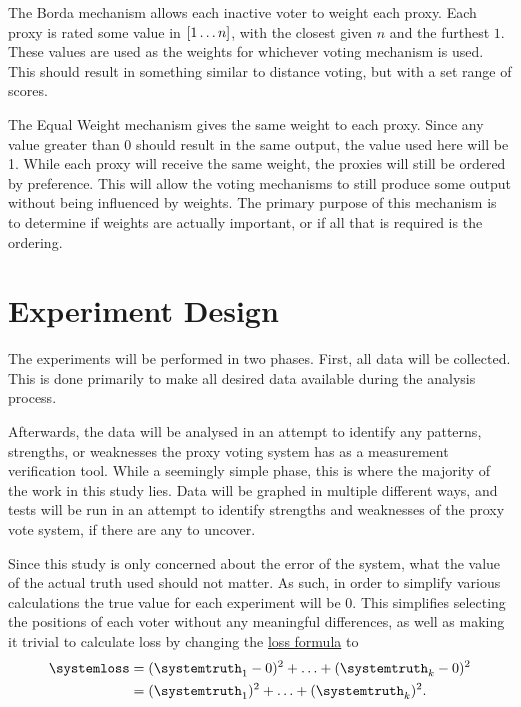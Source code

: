 \label{para:borda}
The Borda mechanism allows each inactive voter to weight each proxy.
Each proxy is rated some value in $[1 \mathellipsis n]$, with the closest
given $n$ and the furthest $1$.
These values are used as the weights for whichever voting mechanism is used.
This should result in something similar to distance voting, but with a set
range of scores.

\label{para:equal-weight}
The Equal Weight mechanism gives the same weight to each proxy.
Since any value greater than 0 should result in the same output, the value used here
will be 1.
While each proxy will receive the same weight, the proxies will still be ordered by
preference.
This will allow the voting mechanisms to still produce some output without being
influenced by weights.
The primary purpose of this mechanism is to determine if weights are actually
important, or if all that is required is the ordering.


\section{Experiment Design}\label{sec:experiment-design}
The experiments will be performed in two phases.
First, all data will be collected.
This is done primarily to make all desired data available during the analysis
process.

Afterwards, the data will be analysed in an attempt to identify any patterns,
strengths, or weaknesses the proxy voting system has as a measurement verification tool.
While a seemingly simple phase, this is where the majority of the work in this study
lies.
Data will be graphed in multiple different ways, and tests will be run in an attempt to
identify strengths and weaknesses of the proxy vote system, if there are any to uncover.

Since this study is only concerned about the error of the system, what the value of the
actual truth used should not matter.
As such, in order to simplify various calculations the true value for each experiment
will be 0.
This simplifies selecting the positions of each voter without any meaningful
differences, as well as making it trivial to calculate loss by changing the
\hyperref[eq:loss]{loss formula} to
\begin{align}
    \systemloss &=
    (\systemtruth_1 - 0)^2 +
    \mathellipsis +
    (\systemtruth_k - 0)^2
    \nonumber \\
    &=
    (\systemtruth_1)^2 +
    \mathellipsis +
    (\systemtruth_k )^2
    \text{.}\label{eq:adjusted-loss}
\end{align}

